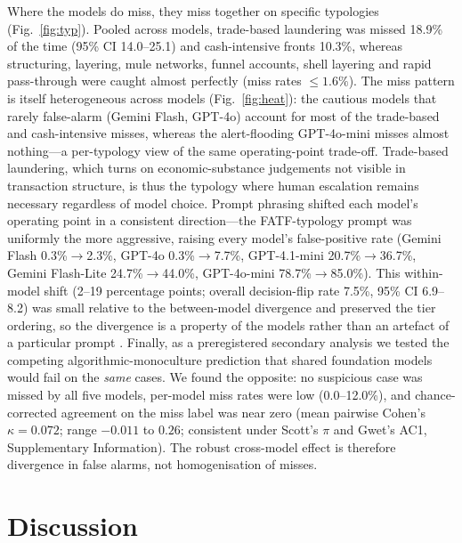 \documentclass[lineno,pdflatex,sn-basic,Numbered]{sn-jnl}
\begin{document}
Where the models do miss, they miss together on specific typologies (Fig.~\ref{fig:typ}). Pooled across models, trade-based laundering was missed 18.9\% of the time (95\% CI 14.0--25.1) and cash-intensive fronts 10.3\%, whereas structuring, layering, mule networks, funnel accounts, shell layering and rapid pass-through were caught almost perfectly (miss rates $\leq 1.6\%$). The miss pattern is itself heterogeneous across models (Fig.~\ref{fig:heat}): the cautious models that rarely false-alarm (Gemini Flash, GPT-4o) account for most of the trade-based and cash-intensive misses, whereas the alert-flooding GPT-4o-mini misses almost nothing---a per-typology view of the same operating-point trade-off. Trade-based laundering, which turns on economic-substance judgements not visible in transaction structure, is thus the typology where human escalation remains necessary regardless of model choice. Prompt phrasing shifted each model's operating point in a consistent direction---the FATF-typology prompt was uniformly the more aggressive, raising every model's false-positive rate (Gemini Flash 0.3\%$\rightarrow$2.3\%, GPT-4o 0.3\%$\rightarrow$7.7\%, GPT-4.1-mini 20.7\%$\rightarrow$36.7\%, Gemini Flash-Lite 24.7\%$\rightarrow$44.0\%, GPT-4o-mini 78.7\%$\rightarrow$85.0\%). This within-model shift (2--19 percentage points; overall decision-flip rate 7.5\%, 95\% CI 6.9--8.2) was small relative to the between-model divergence and preserved the tier ordering, so the divergence is a property of the models rather than an artefact of a particular prompt \cite{promptsens}. Finally, as a preregistered secondary analysis we tested the competing algorithmic-monoculture prediction that shared foundation models would fail on the \emph{same} cases. We found the opposite: no suspicious case was missed by all five models, per-model miss rates were low (0.0--12.0\%), and chance-corrected agreement on the miss label was near zero (mean pairwise Cohen's $\kappa = 0.072$; range $-0.011$ to $0.26$; consistent under Scott's $\pi$ and Gwet's AC1, Supplementary Information). The robust cross-model effect is therefore divergence in false alarms, not homogenisation of misses.

\section{Discussion}\label{sec:discussion}
\end{document}
